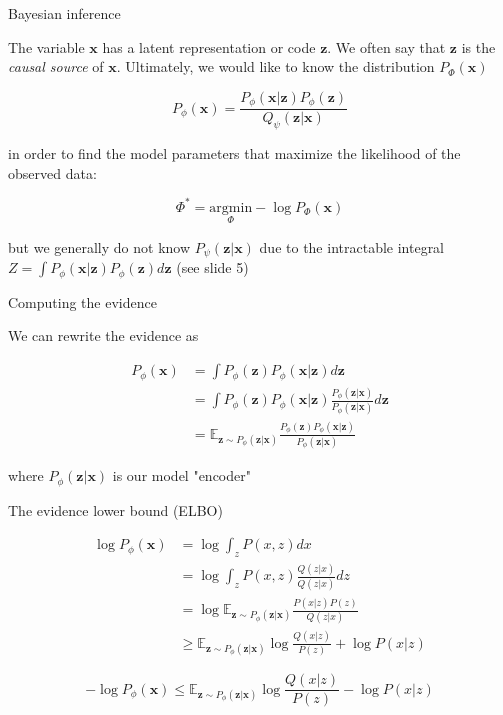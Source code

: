 \documentclass{beamer}					%
\begin{document}
\begin{frame}{Bayesian inference}

The variable $\mathbf{x}$ has a latent representation or code $\mathbf{z}$. We often say that $\mathbf{z}$ is the \emph{causal source} of $\mathbf{x}$. Ultimately, we would like to know the distribution $P_{\Phi}(\mathbf{x})$

\begin{equation*}
P_{\phi}(\mathbf{x}) = \frac{P_{\phi}(\mathbf{x|z})P_{\phi}(\mathbf{z})}{Q_{\psi}(\mathbf{z|x})}
\end{equation*}

in order to find the model parameters that maximize the likelihood of the observed data:

\begin{equation*}
\Phi^{*} = \underset{\Phi}{\mathrm{argmin}} -\log P_{\Phi}(\mathbf{x}) 
\end{equation*}

but we generally do not know $P_{\psi}(\mathbf{z|x})$ due to the intractable integral $Z = \int P_{\phi}(\mathbf{x|z})P_{\phi}(\mathbf{z})d\mathbf{z}$ (see slide 5)

\end{frame}

\begin{frame}{Computing the evidence}

We can rewrite the evidence as

\begin{align*}
P_{\phi}(\mathbf{x}) &= \int P_{\phi}(\mathbf{z})P_{\phi}(\mathbf{x|z})d\mathbf{z}\\
&= \int P_{\phi}(\mathbf{z})P_{\phi}(\mathbf{x|z})\frac{P_{\phi}(\mathbf{z|x})}{P_{\phi}(\mathbf{z|x})}d\mathbf{z}\\
&= \mathbb{E}_{\mathbf{z}\sim P_{\phi}(\mathbf{z|x})} \frac{P_{\phi}(\mathbf{z})P_{\phi}(\mathbf{x|z})}{P_{\phi}(\mathbf{z|x})}
\end{align*}

where $P_{\phi}(\mathbf{z|x})$ is our model "encoder"

\end{frame}

\begin{frame}{The evidence lower bound (ELBO)}

\begin{align*}
\log P_{\phi}(\mathbf{x}) &= \log \int_{z}P(x,z)dx\\
&= \log \int_{z} P(x,z)\frac{Q(z|x)}{Q(z|x)}dz\\
&= \log \mathbb{E}_{\mathbf{z}\sim P_{\phi}(\mathbf{z|x})} \frac{P(x|z)P(z)}{Q(z|x)}\\
&\geq \mathbb{E}_{\mathbf{z}\sim P_{\phi}(\mathbf{z|x})} \log \frac{Q(x|z)}{P(z)} + \log P(x|z)
\end{align*}

\begin{equation*}
-\log P_{\phi}(\mathbf{x}) \leq \mathbb{E}_{\mathbf{z}\sim P_{\phi}(\mathbf{z|x})} \log \frac{Q(x|z)}{P(z)} - \log P(x|z)
\end{equation*}


\end{frame}
\end{document}
